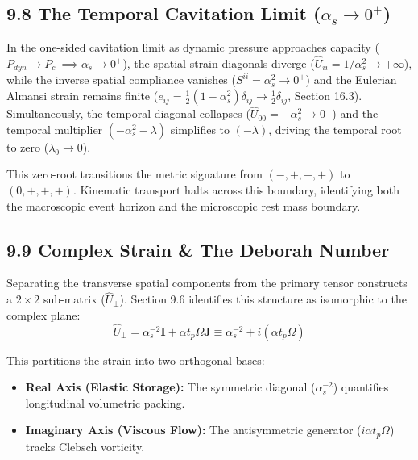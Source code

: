 \subsection*{9.8 The Temporal Cavitation Limit ($\alpha_s \to 0^+$)} %
In the one-sided cavitation limit as dynamic pressure approaches capacity ($P_{dyn} \to P_c^- \implies \alpha_s \to 0^+$), the spatial strain diagonals diverge ($\hat{U}_{ii} = 1/\alpha_s^2 \to +\infty$), while the inverse spatial compliance vanishes ($S^{ii} = \alpha_s^2 \to 0^+$) and the Eulerian Almansi strain remains finite ($e_{ij} = \frac{1}{2}(1 - \alpha_s^2)\delta_{ij} \to \frac{1}{2}\delta_{ij}$, Section 16.3). Simultaneously, the temporal diagonal collapses ($\hat{U}_{00} = -\alpha_s^2 \to 0^-$) and the temporal multiplier $(-\alpha_s^2 - \lambda)$ simplifies to $(-\lambda)$, driving the temporal root to zero ($\lambda_0 \to 0$). %

This zero-root transitions the metric signature from $(-,+,+,+)$ to $(0,+,+,+)$. Kinematic transport halts across this boundary, identifying both the macroscopic event horizon and the microscopic rest mass boundary. %

\subsection*{9.9 Complex Strain \& The Deborah Number} 

Separating the transverse spatial components from the primary tensor constructs a $2 \times 2$ sub-matrix ($\hat{U}_{\perp}$). Section 9.6 identifies this structure as isomorphic to the complex plane:
\begin{equation}
    \hat{U}_{\perp} = \alpha_s^{-2} \mathbf{I} + \alpha t_p \Omega \mathbf{J} \equiv \alpha_s^{-2} + i (\alpha t_p \Omega)
\end{equation}

This partitions the strain into two orthogonal bases:
\begin{itemize}
    \item \textbf{Real Axis (Elastic Storage):} The symmetric diagonal ($\alpha_s^{-2}$) quantifies longitudinal volumetric packing.
    \item \textbf{Imaginary Axis (Viscous Flow):} The antisymmetric generator ($i \alpha t_p \Omega$) tracks Clebsch vorticity.
\end{itemize}

